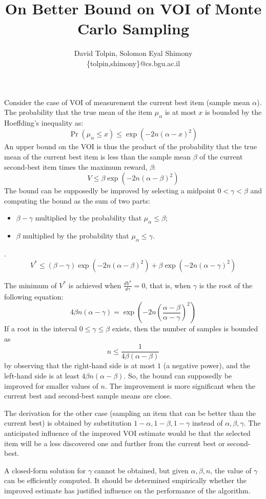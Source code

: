 \documentclass{article}
\title{On Better Bound on VOI of Monte Carlo Sampling}
\author {David Tolpin, Solomon Eyal Shimony \\
\{tolpin,shimony\}@cs.bgu.ac.il}
\begin{document}
\maketitle

Consider the case of VOI of measurement the current best item (sample mean
$\alpha$). The probability that the true mean of the item $\mu_\alpha$ is at
most $x$ is bounded by the Hoeffding's inequality as:
\[ \Pr(\mu_\alpha \le x) \le \exp\left(-2n(\alpha-x)^2\right) \]
An upper bound on the VOI is thus the product of the probability that
the true mean of the current best item is less than the sample mean
$\beta$ of the current second-best item times the maximum reward,
$\beta$:
\[ V \le \beta \exp\left(-2n(\alpha-\beta)^2\right) \]
The bound can be supposedly be improved by selecting a midpoint
$0 < \gamma < \beta$ and computing the bound as the sum of two parts:
\begin{itemize}
\item $\beta-\gamma$ multiplied by the probability that
  $\mu_\alpha \le \beta$;
\item $\beta$ multiplied by the probability that $\mu_\alpha\le
  \gamma$.
\end{itemize}.
\[ V^* \le (\beta-\gamma)\exp\left(-2n(\alpha-\beta)^2\right)+\beta\exp\left(-2n(\alpha-\gamma)^2\right) \]

\vspace{\baselineskip}

The minimum of $V^*$ is achieved when $\frac {dV^*} {d\gamma}=0$, that
is, when $\gamma$ is the root of the following equation:
\[ 4\beta n(\alpha-\gamma)=\exp\left(-2n\left(\frac {\alpha-\beta}
    {\alpha-\gamma}\right)^2\right) \]
If a root in the interval  $0\le\gamma\le\beta$ exists, then the
number of samples is bounded as
\[n\le\frac 1 {4\beta(\alpha-\beta)}\]
by observing that the right-hand side 
is at most $1$ (a negative power), and the left-hand side is at least
$4\beta n(\alpha-\beta)$.
So, the bound can supposedly be improved for smaller values of
$n$. The improvement is more significant when the current best and
second-best sample means are close.

The derivation for the other case
(sampling an item that can be better than the current best) is
obtained by substitution $1-\alpha, 1-\beta, 1-\gamma$ instead of
$\alpha, \beta, \gamma$. The anticipated influence of the improved
VOI estimate would be that the selected item will be a less discovered
one and further from the current best or second-best.

A closed-form solution for $\gamma$ cannot be obtained, but given
$\alpha, \beta, n$, the value of $\gamma$ can be efficiently
computed. It should be determined empirically whether the improved
estimate has justified influence on the performance of the algorithm.
\end{document}

